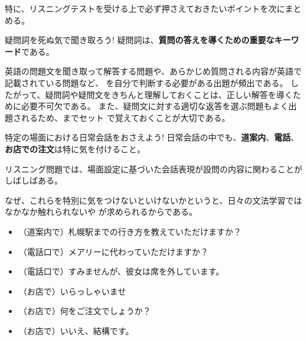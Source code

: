     特に、リスニングテストを受ける上で必ず押さえておきたいポイントを次にまとめる。
\newpage

    \begin{techniquebox}{疑問詞を死ぬ気で聞き取ろう!}
        疑問詞は、\textbf{質問の答えを導くための重要なキーワード}である。
    \end{techniquebox}
\vspace{1em}

    英語の問題文を聞き取って解答する問題や、あらかじめ質問される内容が英語で記載されている問題など、
    を自分で判断する必要がある出題が頻出である。
    したがって、疑問詞や疑問文をきちんと理解しておくことは、正しい解答を導くために必要不可欠である。
    また、疑問文に対する適切な返答を選ぶ問題もよく出題されるため、までセット
    で覚えておくことが大切である。
\vspace{1em}

    \begin{techniquebox}{特定の場面における日常会話をおさえよう!}
        日常会話の中でも、\textbf{道案内}、\textbf{電話}、\textbf{お店での注文}は特に気を付けること。
    \end{techniquebox}
\vspace{1em}
リスニング問題では、場面設定に基づいた会話表現が設問の内容に関わることがしばしばある。

    なぜ、これらを特別に気をつけないといけないかというと、日々の文法学習では
    なかなか触れられないや
    が求められるからである。

    \begin{itemize}
        \item （道案内で）札幌駅までの行き方を教えていただけますか？
        \item （電話口で）メアリーに代わっていただけますか？
        \item （電話口で）すみませんが、彼女は席を外しています。
        \item （お店で）いらっしゃいませ
        \item （お店で）何をご注文でしょうか？
        \item （お店で）いいえ、結構です。
    \end{itemize}
\vspace{1em}

